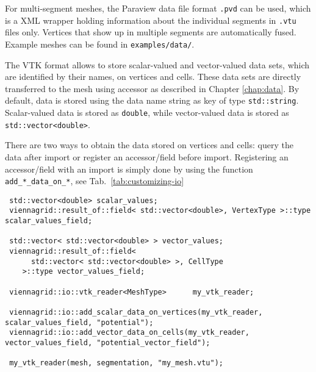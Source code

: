  For multi-segment meshes, the Paraview \cite{paraview} data file format \lstinline|.pvd| can be used, which is a XML wrapper holding information about the individual segments in \lstinline|.vtu| files only. Vertices that show up in multiple segments are automatically fused. Example meshes can be found in \texttt{examples/data/}.


 The VTK format allows to store scalar-valued and vector-valued data sets, which are identified by their names, on vertices and cells.
 These data sets are directly transferred to the {\ViennaGrid} mesh using accessor as described in Chapter \ref{chap:data}.
 By default, data is stored using the data name string as key of type \lstinline|std::string|.
 Scalar-valued data is stored as \lstinline|double|, while vector-valued data is stored as \lstinline|std::vector<double>|.


There are two ways to obtain the data stored on vertices and cells: query the data after import or register an accessor/field before import.
Registering an accessor/field with an import is simply done by using the function \lstinline|add_*_data_on_*|, see Tab.~\ref{tab:customizing-io}

 \begin{lstlisting}
 std::vector<double> scalar_values;
 viennagrid::result_of::field< std::vector<double>, VertexType >::type scalar_values_field;
 
 std::vector< std::vector<double> > vector_values;
 viennagrid::result_of::field<
      std::vector< std::vector<double> >, CellType
    >::type vector_values_field;
 
 viennagrid::io::vtk_reader<MeshType>      my_vtk_reader;
 
 viennagrid::io::add_scalar_data_on_vertices(my_vtk_reader, scalar_values_field, "potential");
 viennagrid::io::add_vector_data_on_cells(my_vtk_reader, vector_values_field, "potential_vector_field");
 
 my_vtk_reader(mesh, segmentation, "my_mesh.vtu");
 \end{lstlisting}
 
